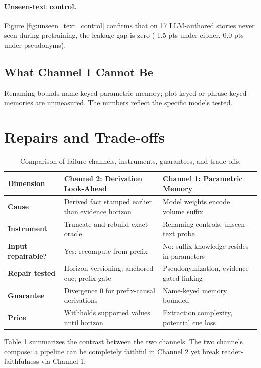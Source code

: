 \documentclass[11pt]{article}
\begin{document}
\paragraph{Unseen-text control.} Figure \ref{fig:unseen_text_control} confirms that on 17 LLM-authored stories never seen during pretraining, the leakage gap is zero (-1.5 pts under cipher, 0.0 pts under pseudonyms).

\subsection{What Channel 1 Cannot Be}
Renaming bounds name-keyed parametric memory; plot-keyed or phrase-keyed memories are unmeasured. The numbers reflect the specific models tested.

\section{Repairs and Trade-offs}

\begin{table}[t]
\centering
\small
\begin{tabular}{lp{6.5cm}p{6.5cm}}
\toprule
\textbf{Dimension} & \textbf{Channel 2: Derivation Look-Ahead} & \textbf{Channel 1: Parametric Memory} \\
\midrule
\textbf{Cause} & Derived fact stamped earlier than evidence horizon & Model weights encode volume suffix \\
\textbf{Instrument} & Truncate-and-rebuild exact oracle & Renaming controls, unseen-text probe \\
\textbf{Input repairable?} & Yes: recompute from prefix & No: suffix knowledge resides in parameters \\
\textbf{Repair tested} & Horizon versioning; anchored cue; prefix gate & Pseudonymization, evidence-gated linking \\
\textbf{Guarantee} & Divergence 0 for prefix-causal derivations & Name-keyed memory bounded \\
\textbf{Price} & Withholds supported values until horizon & Extraction complexity, potential cue loss \\
\bottomrule
\end{tabular}
\caption{Comparison of failure channels, instruments, guarantees, and trade-offs.}
\label{tab:repairs}
\end{table}

Table \ref{tab:repairs} summarizes the contrast between the two channels. The two channels compose: a pipeline can be completely faithful in Channel 2 yet break reader-faithfulness via Channel 1.
\end{document}

